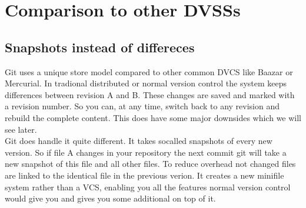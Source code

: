 \section {Comparison to other DVSSs}

\subsection{Snapshots instead of differeces}

Git uses a unique store model compared to other common DVCS like Baazar or Mercurial. 
In tradional distributed or normal version control the system keeps differences between revision A and B. 
These changes are saved and marked with a revision number. 
So you can, at any time, switch back to any revision and rebuild the complete content.
This does have some major downsides which we will see later. \\
Git does handle it quite different. It takes socalled snapshots of every new version. 
So if file A changes in your repository the next commit git will take a new snapshot of this file and all other files. 
To reduce overhead not changed files are linked to the identical file in the previous verion. 
It creates a new minifile system rather than a VCS, enabling you all the features normal version 
control would give you and gives you some additional on top of it. \cite{gitpro2009} 